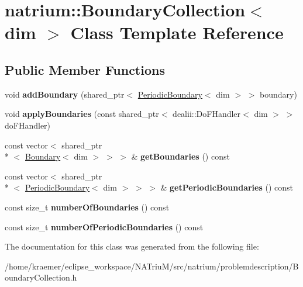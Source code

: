 \hypertarget{classnatrium_1_1BoundaryCollection}{\section{natrium\-:\-:Boundary\-Collection$<$ dim $>$ Class Template Reference}
\label{classnatrium_1_1BoundaryCollection}
}
\subsection*{Public Member Functions}
\begin{DoxyCompactItemize}
\item 
\hypertarget{classnatrium_1_1BoundaryCollection_a60d5efd5fa9bf2107705ee1a38508dd4}{void {\bfseries add\-Boundary} (shared\-\_\-ptr$<$ \hyperlink{classnatrium_1_1PeriodicBoundary}{Periodic\-Boundary}$<$ dim $>$ $>$ boundary)}\label{classnatrium_1_1BoundaryCollection_a60d5efd5fa9bf2107705ee1a38508dd4}

\item 
\hypertarget{classnatrium_1_1BoundaryCollection_a89de2718a8813905dc1487f812e363a2}{void {\bfseries apply\-Boundaries} (const shared\-\_\-ptr$<$ dealii\-::\-Do\-F\-Handler$<$ dim $>$ $>$ do\-F\-Handler)}\label{classnatrium_1_1BoundaryCollection_a89de2718a8813905dc1487f812e363a2}

\item 
\hypertarget{classnatrium_1_1BoundaryCollection_a165425d13fc67c25f13c56ba49468102}{const vector$<$ shared\-\_\-ptr\\*
$<$ \hyperlink{classnatrium_1_1Boundary}{Boundary}$<$ dim $>$ $>$ $>$ \& {\bfseries get\-Boundaries} () const }\label{classnatrium_1_1BoundaryCollection_a165425d13fc67c25f13c56ba49468102}

\item 
\hypertarget{classnatrium_1_1BoundaryCollection_a1d7ac8cc1b11c7b241f16be4a41c4582}{const vector$<$ shared\-\_\-ptr\\*
$<$ \hyperlink{classnatrium_1_1PeriodicBoundary}{Periodic\-Boundary}$<$ dim $>$ $>$ $>$ \& {\bfseries get\-Periodic\-Boundaries} () const }\label{classnatrium_1_1BoundaryCollection_a1d7ac8cc1b11c7b241f16be4a41c4582}

\item 
\hypertarget{classnatrium_1_1BoundaryCollection_aaebf4e5f32663f1f94c08fdc9902c06f}{const size\-\_\-t {\bfseries number\-Of\-Boundaries} () const }\label{classnatrium_1_1BoundaryCollection_aaebf4e5f32663f1f94c08fdc9902c06f}

\item 
\hypertarget{classnatrium_1_1BoundaryCollection_a29d1d56e79872df40cbdd9a8150dd6d3}{const size\-\_\-t {\bfseries number\-Of\-Periodic\-Boundaries} () const }\label{classnatrium_1_1BoundaryCollection_a29d1d56e79872df40cbdd9a8150dd6d3}

\end{DoxyCompactItemize}


The documentation for this class was generated from the following file\-:\begin{DoxyCompactItemize}
\item 
/home/kraemer/eclipse\-\_\-workspace/\-N\-A\-Triu\-M/src/natrium/problemdescription/Boundary\-Collection.\-h\end{DoxyCompactItemize}

